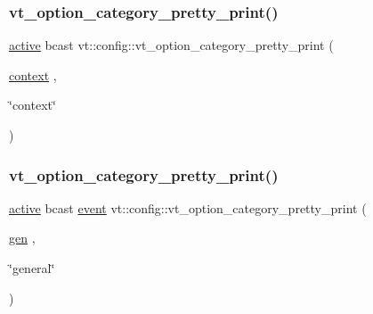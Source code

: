 \mbox{\label{namespacevt_1_1config_a3e5b41b403d80be555390e30c99a37e6}} 
\subsubsection{\texorpdfstring{vt\+\_\+option\+\_\+category\+\_\+pretty\+\_\+print()}{vt\_option\_category\_pretty\_print()}\hspace{0.1cm}{\footnotesize\ttfamily [3/17]}}
{\footnotesize\ttfamily \hyperlink{namespacevt_1_1config_a6bd1d6215bda0d8ca02811798399f689a82f77c67af0c363709010c6df4dbd920}{active} bcast vt\+::config\+::vt\+\_\+option\+\_\+category\+\_\+pretty\+\_\+print (\begin{DoxyParamCaption}\item[{\hyperlink{namespacevt_1_1config_a6bd1d6215bda0d8ca02811798399f689a5dad3be974af03e75e234cb475c2cb20}{context}}]{,  }\item[{\char`\"{}context\char`\"{}}]{ }\end{DoxyParamCaption})}

\mbox{\label{namespacevt_1_1config_a5a0d44353ac07c50109788520b0c8cbd}} 
\subsubsection{\texorpdfstring{vt\+\_\+option\+\_\+category\+\_\+pretty\+\_\+print()}{vt\_option\_category\_pretty\_print()}\hspace{0.1cm}{\footnotesize\ttfamily [4/17]}}
{\footnotesize\ttfamily \hyperlink{namespacevt_1_1config_a6bd1d6215bda0d8ca02811798399f689a82f77c67af0c363709010c6df4dbd920}{active} bcast \hyperlink{namespacevt_1_1config_a6bd1d6215bda0d8ca02811798399f689a9e0b3f734ed730f6f3117f0687eda7df}{event} vt\+::config\+::vt\+\_\+option\+\_\+category\+\_\+pretty\+\_\+print (\begin{DoxyParamCaption}\item[{\hyperlink{namespacevt_1_1config_a6bd1d6215bda0d8ca02811798399f689a5b2fa777115f03c6d550ec721c0a93a5}{gen}}]{,  }\item[{\char`\"{}general\char`\"{}}]{ }\end{DoxyParamCaption})}

